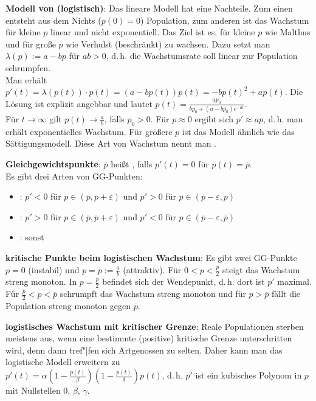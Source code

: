 \textbf{Modell von  (logistisch)}:
Das lineare Modell hat eine Nachteile.
Zum einen entsteht aus dem Nichts ($p(0) = 0$) Population,
zum anderen ist das Wachstum für kleine $p$ linear und nicht exponentiell.
Das Ziel ist es, für kleine $p$ wie Malthus und für große $p$ wie Verhulst (beschränkt) zu wachsen.
Dazu setzt man $\lambda(p) := a - bp$ für $ab > 0$, d.\,h. die Wachstumsrate soll linear zur
Population schrumpfen.\\
Man erhält $p'(t) = \lambda(p(t)) \cdot p(t) = (a - bp(t)) p(t) = -bp(t)^2 + ap(t)$.
Die Lösung ist explizit angebbar und lautet $p(t) = \frac{ap_0}{bp_0 + (a-bp_0) e^{-at}}$.\\
Für $t \to \infty$ gilt $p(t) \to \frac{a}{b}$, falls $p_0 > 0$.
Für $p \approx 0$ ergibt sich $p' \approx ap$, d.\,h. man erhält exponentielles Wachstum.
Für größere $p$ ist das Modell ähnlich wie das Sättigungsmodell.
Diese Art von Wachstum nennt man .

\textbf{Gleichgewichtspunkte}:
$\overline{p}$ heißt , falls $p'(t) = 0$ für
$p(t) = \overline{p}$.\\
Es gibt drei Arten von GG-Punkten:
\begin{itemize}
    \item
    :
    $p' < 0$ für $p \in (\overline{p}, \overline{p} + \varepsilon)$ und
    $p' > 0$ für $p \in (\overline{p} - \varepsilon, \overline{p})$

    \item
    :
    $p' > 0$ für $p \in (\overline{p}, \overline{p} + \varepsilon)$ und
    $p' < 0$ für $p \in (\overline{p} - \varepsilon, \overline{p})$

    \item
    :
    sonst
\end{itemize}

\textbf{kritische Punkte beim logistischen Wachstum}:
Es gibt zwei GG-Punkte $p = 0$ (instabil) und $p = \overline{p} := \frac{a}{b}$ (attraktiv).
Für $0 < p < \frac{\overline{p}}{2}$ steigt das Wachstum streng monoton.
In $p = \frac{\overline{p}}{2}$ befindet sich der Wendepunkt, d.\,h. dort ist $p'$ maximal.
Für $\frac{\overline{p}}{2} < p < \overline{p}$ schrumpft das Wachstum streng monoton
und für $p > \overline{p}$ fällt die Population streng monoton gegen $\overline{p}$.

\linie

\textbf{logistisches Wachstum mit kritischer Grenze}:
Reale Populationen sterben meistens aus, wenn eine bestimmte (positive) kritische Grenze
unterschritten wird, denn dann tref"|fen sich Artgenossen zu selten.
Daher kann man das logistische Modell erweitern zu\\
$p'(t) = \alpha (1 - \frac{p(t)}{\beta}) (1 - \frac{p(t)}{\delta}) p(t)$,
d.\,h. $p'$ ist ein kubisches Polynom in $p$ mit Nullstellen $0$, $\beta$, $\gamma$.

